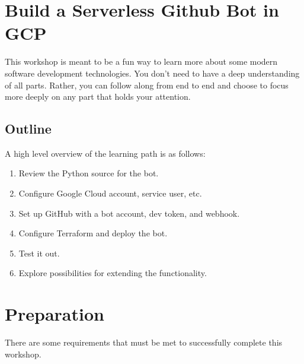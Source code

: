 







\section{\label{sec:Start}Build a Serverless Github Bot in GCP}
\vspace{2mm}

\justifying
This workshop is meant to be a fun way to learn more about some modern software development technologies. You don't need to have a deep understanding of all parts. Rather, you can follow along from end to end and choose to focus more deeply on any part that holds your attention.

\subsection{\label{sec:outline}Outline}

\justifying
A high level overview of the learning path is as follows:

\begin{raggedright}
	\begin{enumerate}
		\item Review the Python source for the bot.
		\item Configure Google Cloud account, service user, etc.
		\item Set up GitHub with a bot account, dev token, and webhook.
		\item Configure Terraform and deploy the bot.
		\item Test it out.
		\item Explore possibilities for extending the functionality.
	\end{enumerate}
\end{raggedright}
\vspace{2mm}

\section{\label{sec:preparation}Preparation}

\justifying
There are some requirements that must be met to successfully complete this workshop.

